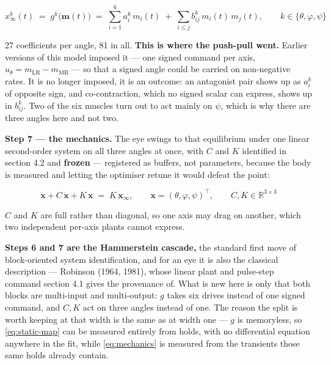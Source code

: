 \documentclass[10pt]{article}
\begin{document}
\begin{equation}
\label{eq:static-map}
x^{k}_{\infty}(t)\;=\;g^{k}\big(\mathbf{m}(t)\big)\;=\; \sum_{i=1}^{6} a^{k}_{i}\,m_i(t)
\;+\;\sum_{i\le j} b^{k}_{ij}\,m_i(t)\,m_j(t),
\qquad k\in\{\theta,\varphi,\psi\}
\end{equation}

27 coefficients per angle, 81 in all. \textbf{This is where the push-pull went.} Earlier
versions of this model imposed it --- one signed command per axis, $u_\theta =
m_{\mathrm{LR}} - m_{\mathrm{MR}}$ --- so that a signed angle could be carried on
non-negative rates. It is no longer imposed, it is an outcome: an antagonist pair shows up
as $a^{k}_{i}$ of opposite sign, and co-contraction, which no signed scalar can express,
shows up in $b^{k}_{ij}$. Two of the six muscles turn out to act mainly on $\psi$, which is
why there are three angles here and not two.

\textbf{Step 7 --- the mechanics.} The eye swings to that equilibrium under one linear
second-order system on all three angles at once, with $C$ and $K$ identified in section 4.2
and \textbf{frozen} --- registered as buffers, not parameters, because the body is measured
and letting the optimiser retune it would defeat the point:

\begin{equation}
\label{eq:mechanics}
\ddot{\mathbf{x}} + C\,\dot{\mathbf{x}} + K\,\mathbf{x} \;=\; K\,\mathbf{x}_{\infty},
\qquad
\mathbf{x}=(\theta,\varphi,\psi)^{\!\top},
\qquad
C,K\in\mathbb{R}^{3\times 3}
\end{equation}

$C$ and $K$ are full rather than diagonal, so one axis may drag on another, which two
independent per-axis plants cannot express.

\textbf{Steps 6 and 7 are the Hammerstein cascade,} the standard first move of
block-oriented system identification, and for an eye it is also the classical description
--- Robinson (1964, 1981), whose linear plant and pulse-step command section 4.1 gives the
provenance of. What is new here is only that both blocks are multi-input and multi-output:
$g$ takes six drives instead of one signed command, and $C,K$ act on three angles instead of
one. The reason the split is worth keeping at that width is the same as at width one --- $g$
is memoryless, so \eqref{eq:static-map} can be measured entirely from holds, with no
differential equation anywhere in the fit, while \eqref{eq:mechanics} is measured from the
transients those same holds already contain.
\end{document}
